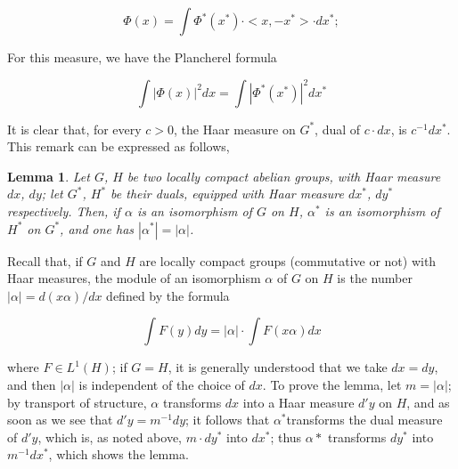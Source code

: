 \documentclass[12pt]{amsart}
\newtheorem{lemma}{Lemma}
\begin{document}
\[
\Phi(x)=\int\Phi^{*}(x^{*})\cdot<x,-x^{*}>\cdot dx^{*};\]


For this measure, we have the Plancherel formula

\[
\int|\Phi(x)|^{2}dx=\int|\Phi^{*}(x^{*})|^{2}dx^{*}\]


It is clear that, for every $c>0$, the Haar measure on $G^{*}$,
dual of $c\cdot dx$, is $c^{-1}dx^{*}$. This remark can be expressed
as follows,

\begin{lemma}\label{l:1}
Let $G$, $H$ be two locally compact abelian groups,
with Haar measure $dx$, $dy$; let $G^*$, $H^*$ be their duals,
equipped with Haar measure $dx^*$, $dy^*$ respectively. Then,
if $\alpha$ is an isomorphism of $G$ on $H$, $\alpha^{*}$ is an
isomorphism of $H^{*}$ on $G^{*}$, and one has $|\alpha^{*}|=|\alpha|$.
\end{lemma}

Recall that, if $G$ and $H$ are locally compact groups (commutative
or not) with Haar measures, the module of an isomorphism $\alpha$
of $G$ on $H$ is the number $|\alpha|=d(x\alpha)/dx$ defined by
the formula

\[
\int F(y)dy=|\alpha|\cdot\int F(x\alpha)dx\]


where $F\in L^{1}(H)$; if $G=H$, it is generally understood that
we take $dx=dy$, and then $|\alpha|$ is independent of the choice
of $dx$. To prove the lemma, let $m=|\alpha|$; by transport of structure,
$\alpha$ transforms $dx$ into a Haar measure $d'y$ on $H$, and
as soon as we see that $d'y=m^{-1}dy$; it follows that $\alpha^{*}$transforms
the dual measure of $d'y$, which is, as noted above, $m\cdot dy^{*}$
into $dx^{*}$; thus $\alpha*$ transforms $dy^{*}$ into $m^{-1}dx^{*}$,
which shows the lemma.
\end{document}
